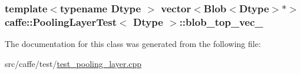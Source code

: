 \hypertarget{classcaffe_1_1_pooling_layer_test_a9ffa0628b08c6223f2f8fd4646ef0aca}{
\subsubsection[{blob\+\_\+top\+\_\+vec\+\_\+}]{\setlength{\rightskip}{0pt plus 5cm}template$<$typename Dtype $>$ vector$<${\bf Blob}$<$Dtype$>$$\ast$$>$ {\bf caffe\+::\+Pooling\+Layer\+Test}$<$ Dtype $>$\+::blob\+\_\+top\+\_\+vec\+\_\+\hspace{0.3cm}{\ttfamily [protected]}}}\label{classcaffe_1_1_pooling_layer_test_a9ffa0628b08c6223f2f8fd4646ef0aca}


The documentation for this class was generated from the following file\+:\begin{DoxyCompactItemize}
\item 
src/caffe/test/\hyperlink{test__pooling__layer_8cpp}{test\+\_\+pooling\+\_\+layer.\+cpp}\end{DoxyCompactItemize}
